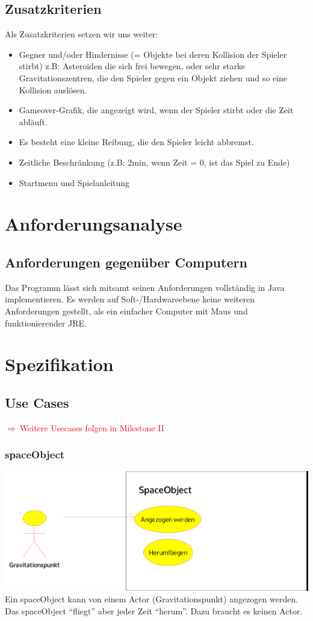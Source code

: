 \documentclass[12pt,a4paper]{scrartcl}
\newcommand{\q}[1]{``#1''}
\newcommand{\todo}[1]{\begin{Large}\textcolor{red}{$\Rightarrow ~$#1}\end{Large}}
\begin{document}
\subsection{Zusatzkriterien}
Als Zusatzkriterien setzen wir uns weiter:
\begin{itemize}
\item Gegner und/oder Hindernisse (= Objekte bei deren Kollision der Spieler stirbt) z.B: Asteroiden die sich frei bewegen, oder sehr starke Gravitationszentren, die den Spieler gegen ein Objekt ziehen und so eine Kollision auslösen.
\item Gameover-Grafik, die angezeigt wird, wenn der Spieler stirbt oder die Zeit abläuft.
\item Es besteht eine kleine Reibung, die den Spieler leicht abbremst.
\item Zeitliche Beschränkung (z.B: 2min, wenn Zeit = 0, ist das Spiel zu Ende)
\item Startmenu und Spielanleitung
\end{itemize}




\section{Anforderungsanalyse}
\subsection{Anforderungen gegenüber Computern}
Das Programm lässt sich mitsamt seinen Anforderungen vollständig in Java implementieren.
Es werden auf Soft-/Hardwareebene keine weiteren Anforderungen gestellt, als ein einfacher Computer mit
Maus und funktionierender JRE.


\section{Spezifikation}
\subsection{Use Cases}
\todo{Weitere Usecases folgen in Milestone II}

\subsubsection{spaceObject}
\includegraphics[scale=0.2]{use_cases/spaceObject.png}\\
Ein spaceObject kann von einem Actor (Gravitationspunkt) angezogen werden. Das spaceObject
\q{fliegt} aber jeder Zeit \q{herum}. Dazu braucht es keinen Actor.
\end{document}
